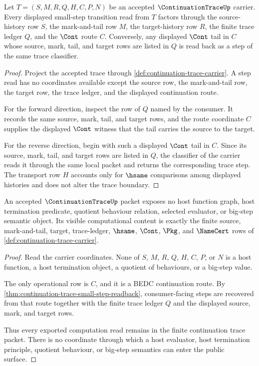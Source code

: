 \begin{theorem}
\label{thm:continuation-trace-small-step-readback}
Let $T=(S,M,R,Q,H,C,P,N)$ be an accepted $\ContinuationTraceUp$ carrier. Every displayed small-step transition read from $T$ factors through the source-history row $S$, the mark-and-tail row $M$, the target-history row $R$, the finite trace ledger $Q$, and the $\Cont$ route $C$. Conversely, any displayed $\Cont$ tail in $C$ whose source, mark, tail, and target rows are listed in $Q$ is read back as a step of the same trace classifier.
\end{theorem}
\begin{proof}
Project the accepted trace through \autoref{def:continuation-trace-carrier}. A step read has no coordinates available except the source row, the mark-and-tail row, the target row, the trace ledger, and the displayed continuation route.

For the forward direction, inspect the row of $Q$ named by the consumer. It records the same source, mark, tail, and target rows, and the route coordinate $C$ supplies the displayed $\Cont$ witness that the tail carries the source to the target.

For the reverse direction, begin with such a displayed $\Cont$ tail in $C$. Since its source, mark, tail, and target rows are listed in $Q$, the classifier of the carrier reads it through the same local packet and returns the corresponding trace step. The transport row $H$ accounts only for $\hsame$ comparisons among displayed histories and does not alter the trace boundary.
\end{proof}

\begin{theorem}
\label{thm:continuation-trace-non-escape-boundary}
An accepted $\ContinuationTraceUp$ packet exposes no host function graph, host termination predicate, quotient behaviour relation, selected evaluator, or big-step semantic object. Its visible computational content is exactly the finite source, mark-and-tail, target, trace-ledger, $\hsame$, $\Cont$, $\Pkg$, and $\NameCert$ rows of \autoref{def:continuation-trace-carrier}.
\end{theorem}
\begin{proof}
Read the carrier coordinates. None of $S$, $M$, $R$, $Q$, $H$, $C$, $P$, or $N$ is a host function, a host termination object, a quotient of behaviours, or a big-step value.

The only operational row is $C$, and it is a BEDC continuation route. By \autoref{thm:continuation-trace-small-step-readback}, consumer-facing steps are recovered from that route together with the finite trace ledger $Q$ and the displayed source, mark, and target rows.

Thus every exported computation read remains in the finite continuation trace packet. There is no coordinate through which a host evaluator, host termination principle, quotient behaviour, or big-step semantics can enter the public surface.
\end{proof}

